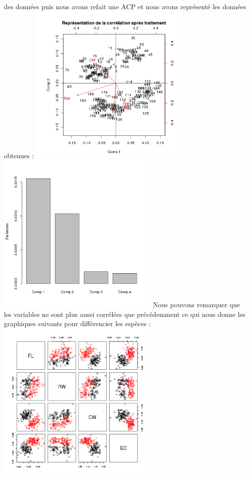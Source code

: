 \documentclass[a4paper, 10pt]{article}
\begin{document}
des donn\'ees puis nous avons refait une ACP et nous avons repr\'esent\'e les donn\'ees obtenues :
\includegraphics[height = 8cm, width = 8cm]{plots/biplot_acp3_crabs.png}
\includegraphics[height = 8cm, width = 8cm]{plots/plot_acp3_crabs.png}\newpage
Nous pouvons remarquer que les variables ne sont plus aussi corr\'el\'ees que pr\'ec\'edemment ce qui nous donne les graphiques suivants
pour diff\'erencier les esp\`eces :\\
\includegraphics[height = 8cm, width = 8cm]{plots/plot_crabs_sp_2.png}\\
\end{document}
